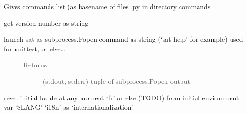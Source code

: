 \documentclass[a4paper,10pt,english]{sphinxmanual}
\begin{document}

\begin{fulllineitems}
\label{\detokenize{apidoc_src/src:src.salomeTools.getCommandsList}}
Gives commands list (as basename of files .py in directory commands

\end{fulllineitems}


\begin{fulllineitems}
\label{\detokenize{apidoc_src/src:src.salomeTools.getVersion}}
get version number as string

\end{fulllineitems}


\begin{fulllineitems}
\label{\detokenize{apidoc_src/src:src.salomeTools.launchSat}}
launch sat as subprocess.Popen
command as string (‘sat \textendash{}help’ for example)
used for unittest, or else…
\begin{quote}\begin{description}
\item[{Returns}] \leavevmode
(stdout, stderr) tuple of subprocess.Popen output

\end{description}\end{quote}

\end{fulllineitems}


\begin{fulllineitems}
\label{\detokenize{apidoc_src/src:src.salomeTools.setLocale}}
reset initial locale at any moment 
‘fr’ or else (TODO) from initial environment var ‘\$LANG’
‘i18n’ as ‘internationalization’

\end{fulllineitems}
\end{document}
